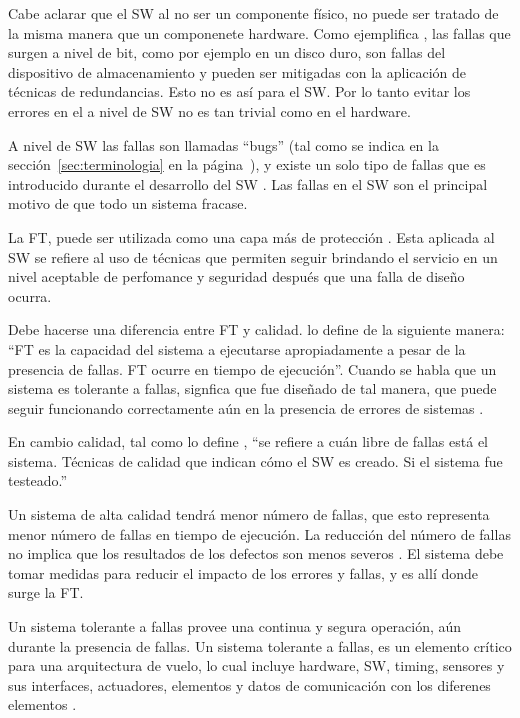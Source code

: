 Cabe aclarar que el \ac{SW} al no ser un componente físico, no puede ser tratado de la misma 
manera que un componenete hardware. Como ejemplifica \cite{SoftwareFaultToleranceATutorial}, las 
fallas que surgen a nivel de bit, como por ejemplo en un disco duro, son fallas del dispositivo de 
almacenamiento y pueden ser mitigadas con la aplicación de técnicas de redundancias. Esto no es así 
para el \ac{SW}. Por lo tanto evitar los errores en el a nivel de \ac{SW} no es tan trivial como 
en el hardware.

A nivel de \ac{SW} las fallas son llamadas ``bugs'' (tal como se indica en la
sección~\ref{sec:terminologia} en la página~\pageref{sec:terminologia}), y existe 
un solo tipo de fallas que es introducido durante el desarrollo del \ac{SW} 
\citep{SoftwareFaultToleranceATutorial}. Las fallas en el \ac{SW} son el principal motivo de que 
todo un sistema fracase. 

La \ac{FT}, puede ser utilizada como una capa más de protección 
\citep{SoftwareFaultToleranceATutorial}. Esta aplicada al \ac{SW} se refiere al uso de técnicas que 
permiten seguir brindando el servicio en un nivel aceptable de perfomance y seguridad después que 
una falla de diseño ocurra. 

Debe hacerse una diferencia entre \ac{FT} y calidad. \cite{Hanmer07} lo define de la 
siguiente manera: ``\ac{FT} es la capacidad del sistema a ejecutarse apropiadamente a 
pesar de la presencia de fallas. \ac{FT} ocurre en tiempo de ejecución''. Cuando se 
habla que un sistema es tolerante a fallas, signfica que fue diseñado de tal manera, que 
puede seguir funcionando correctamente aún en la presencia de errores de sistemas \citep{Hanmer07}. 

En cambio calidad, tal como lo define \cite{Hanmer07}, ``se refiere a cuán libre de fallas está el 
sistema. Técnicas de calidad que indican cómo el \ac{SW} es creado. Si el sistema fue testeado.'' 

Un sistema de alta calidad tendrá menor número de fallas, que esto representa menor número de 
fallas en tiempo de ejecución. La reducción del número de fallas no implica que los resultados de 
los defectos son menos severos \citep{Hanmer07}. El sistema debe tomar medidas para reducir el 
impacto de los errores y fallas, y es allí donde surge la \ac{FT}.	

Un sistema tolerante a fallas provee una continua y segura operación, aún durante la presencia 
de fallas. Un sistema tolerante a fallas, es un elemento crítico para una arquitectura de vuelo, lo 
cual incluye hardware, \ac{SW}, timing, sensores y sus interfaces, actuadores, elementos y datos 
de comunicación con los diferenes elementos \citep{FTAvionics}. 

